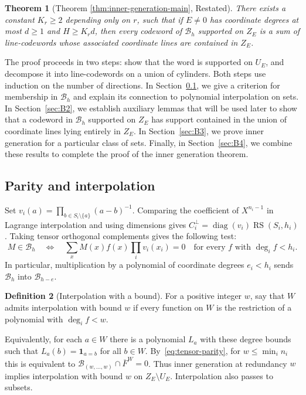 \documentclass[11pt,letterpaper]{article}
\renewcommand{\le}{\leqslant}
\renewcommand{\ge}{\geqslant}
\newtheorem{theorem}{Theorem}[section]
\theoremstyle{definition}
\newtheorem{definition}[theorem]{Definition}
\theoremstyle{remark}
\newcommand{\cB}{\mathcal B}
\newcommand{\RS}{\operatorname{RS}}
\newcommand{\diag}{\operatorname{diag}}
\begin{document}
\begin{theorem}[Theorem \ref{thm:inner-generation-main}, Restated]
\label{thm:inner-generation-restated}
There exists a constant $K_r\ge2$ depending only on $r$, such that if $E\ne0$ has coordinate degrees
at most $d\ge1$ and $H\ge K_rd$, then every codeword of $\cB_h$
supported on $Z_E$ is a sum of line-codewords whose associated coordinate lines are contained in $Z_E$.
\end{theorem}

The proof proceeds in two steps: show that the word is supported on $U_E$,
and decompose it into line-codewords on a union of cylinders.
Both steps use induction on the number of directions.
In Section~\ref{sec:B1}, we give a criterion for membership in
$\mathcal{B}_h$ and explain its connection to polynomial interpolation
on sets. In Section~\ref{sec:B2}, we establish auxiliary lemmas that will be
used later to show that a codeword in $\mathcal{B}_h$ supported on
$Z_E$ has support contained in the union of coordinate lines lying
entirely in $Z_E$.
In Section~\ref{sec:B3}, we prove inner generation for a particular
class of sets. Finally, in Section~\ref{sec:B4}, we combine these
results to complete the proof of the inner generation theorem.

\subsection{Parity and interpolation}
\label{sec:B1}
Set $v_i(a)=\prod_{b\in S_i\setminus\{a\}}(a-b)^{-1}$.
Comparing the coefficient of $X^{n_i-1}$ in Lagrange interpolation
and using dimensions gives $C_i^\perp=\diag(v_i)\RS(S_i,h_i)$.
Taking tensor orthogonal complements gives the following test:
\begin{equation}
 M\in\cB_h\quad\Longleftrightarrow\quad
 \sum_x M(x)f(x)\prod_i v_i(x_i)=0
 \quad\text{for every }f\text{ with }\deg_i f<h_i.
 \label{eq:tensor-parity}
\end{equation}
In particular, multiplication by a polynomial of coordinate degrees
$e_i<h_i$ sends $\cB_h$ into $\cB_{h-e}$.

\begin{definition}[Interpolation with a bound]
    For a positive integer $w$, say that $W$ admits interpolation with bound $w$ if
every function on $W$ is the restriction of a polynomial with
$\deg_i f<w$.    
\end{definition}
Equivalently, for each $a\in W$ there is a polynomial
$L_a$ with these degree bounds such that $L_a(b)=\mathbf1_{a=b}$
for all $b\in W$. By~\eqref{eq:tensor-parity}, for $w\le\min_i n_i$ this is
equivalent to $\cB_{(w,\ldots,w)}\cap\overline F^W=0$.
Thus inner generation at redundancy $w$ implies interpolation
with bound $w$ on $Z_E\setminus U_E$. Interpolation also passes
to subsets.
\end{document}
